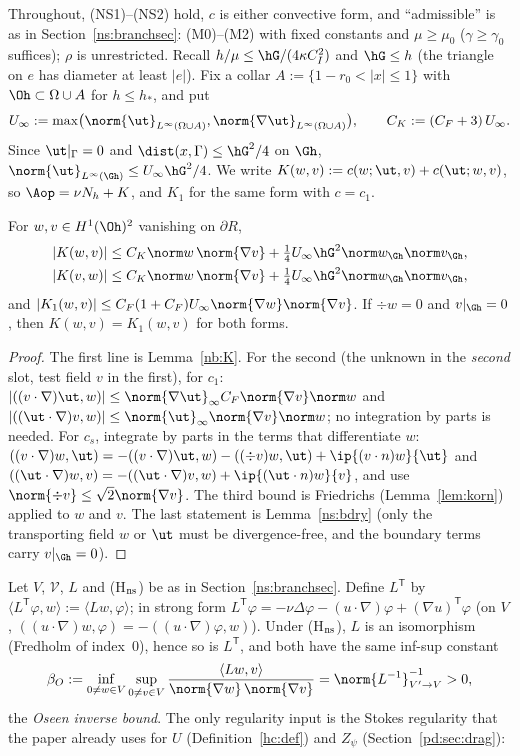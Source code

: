 Throughout, (NS1)--(NS2) hold, $c$ is either convective form, and ``admissible'' is as in Section~\ref{ns:branchsec}: (M0)--(M2)
with fixed constants and $\mu\ge\mu_0$ ($\gamma\ge\gamma_0$ suffices); $\rho$ is unrestricted. Recall $h/\mu\le\hG/(4\kappa C_I^2)$
and $\hG\le h$ (the triangle on $e$ has diameter at least $|e|$). Fix a collar $A:=\{1-r_0<|x|\le1\}$ with $\Oh\subset\Omega\cup A$
for $h\le h_\ast$, and put
\[
U_\infty:=\max\bigl(\norm{\ut}_{L^\infty(\Omega\cup A)},\norm{\nabla\ut}_{L^\infty(\Omega\cup A)}\bigr),\qquad C_K:=(C_F+3)\,U_\infty .
\]
Since $\ut|_\Gamma=0$ and $\dist(x,\Gamma)\le\hG^2/4$ on $\Gh$, $\norm{\ut}_{L^\infty(\Gh)}\le U_\infty\hG^2/4$.
We write $K(w,v):=c(w;\ut,v)+c(\ut;w,v)$, so $\Aop=\nu N_h+K$, and $K_1$ for the same form with $c=c_1$.

\begin{lemma}\label{n2:K}
For $w,v\in H^1(\Oh)^2$ vanishing on $\partial R$,
\begin{align*}
|K(w,v)|&\le C_K\norm w\,\norm{\nabla v}+\tfrac14U_\infty\hG^2\norm w_{\Gh}\norm v_{\Gh},\\
|K(v,w)|&\le C_K\norm w\,\norm{\nabla v}+\tfrac14U_\infty\hG^2\norm w_{\Gh}\norm v_{\Gh},
\end{align*}
and $|K_1(w,v)|\le C_F(1+C_F)U_\infty\norm{\nabla w}\norm{\nabla v}$. If $\div w=0$ and $v|_{\Gh}=0$, then $K(w,v)=K_1(w,v)$ for both forms.
\end{lemma}

\begin{proof}
The first line is Lemma~\ref{nb:K}. For the second (the unknown in the \emph{second} slot, test field $v$ in the first), for $c_1$:
$|((v\cdot\nabla)\ut,w)|\le\norm{\nabla\ut}_\infty C_F\norm{\nabla v}\norm w$ and $|((\ut\cdot\nabla)v,w)|\le\norm{\ut}_\infty\norm{\nabla v}\norm w$; no
integration by parts is needed. For $c_s$, integrate by parts in the terms that differentiate $w$:
$((v\cdot\nabla)w,\ut)=-((v\cdot\nabla)\ut,w)-((\div v)w,\ut)+\ip{(v\cdot n)w}{\ut}$ and
$((\ut\cdot\nabla)w,v)=-((\ut\cdot\nabla)v,w)+\ip{(\ut\cdot n)w}{v}$, and use $\norm{\div v}\le\sqrt2\norm{\nabla v}$. The third bound
is Friedrichs (Lemma~\ref{lem:korn}) applied to $w$ and $v$. The last statement is Lemma~\ref{ns:bdry} (only the transporting field
$w$ or $\ut$ must be divergence-free, and the boundary terms carry $v|_{\Gh}=0$).
\end{proof}

Let $V$, $\mathcal V$, $L$ and (H$_{\rm ns}$) be as in Section~\ref{ns:branchsec}. Define $L^{\mathsf T}$ by
$\langle L^{\mathsf T}\varphi,w\rangle:=\langle Lw,\varphi\rangle$; in strong form $L^{\mathsf T}\varphi=-\nu\Delta\varphi-(u\cdot\nabla)\varphi+(\nabla u)^{\mathsf T}\varphi$
(on $V$, $((u\cdot\nabla)w,\varphi)=-((u\cdot\nabla)\varphi,w)$). Under (H$_{\rm ns}$), $L$ is an isomorphism (Fredholm of index~$0$), hence
so is $L^{\mathsf T}$, and both have the same inf-sup constant
\[
\beta_O:=\inf_{0\ne w\in V}\sup_{0\ne v\in V}\frac{\langle Lw,v\rangle}{\norm{\nabla w}\,\norm{\nabla v}}=\norm{L^{-1}}^{-1}_{V'\to V}>0 ,
\]
the \emph{Oseen inverse bound}. The only regularity input is the Stokes regularity that the paper already uses for $U$
(Definition~\ref{hc:def}) and $Z_\psi$ (Section~\ref{pd:sec:drag}):

